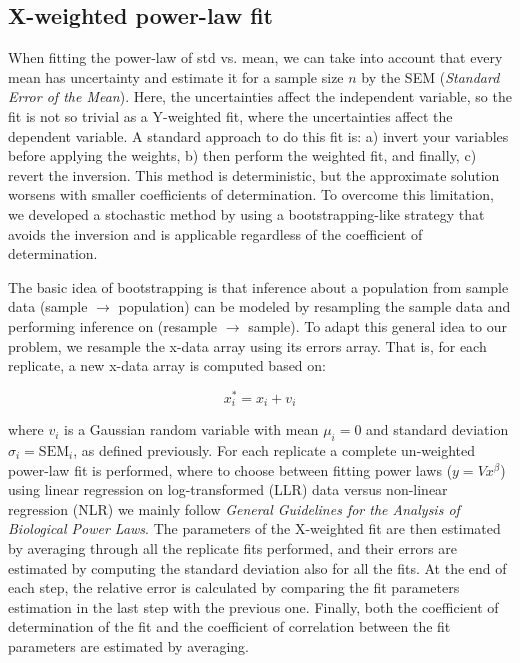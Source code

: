 \subsection*{X-weighted power-law fit}\label{sec:X-w}

When fitting the power-law of std vs. mean, we can take into account that every mean has uncertainty and estimate it for a sample size $n$ by the SEM (\emph{Standard Error of the Mean}). Here, the uncertainties affect the independent variable, so the fit is not so trivial as a Y-weighted fit, where the uncertainties affect the dependent variable. A standard approach to do this fit is: a) invert your variables before applying the weights, b) then perform the weighted fit, and finally, c) revert the inversion. This method is deterministic, but the approximate solution worsens with smaller coefficients of determination. To overcome this limitation, we developed a stochastic method by using a bootstrapping-like strategy that avoids the inversion and is applicable regardless of the coefficient of determination. 

The basic idea of bootstrapping is that inference about a population from sample data (sample $\rightarrow$ population) can be modeled by resampling the sample data and performing inference on (resample $\rightarrow$ sample)\cite{boot}. To adapt this general idea to our problem, we resample the x-data array using its errors array. That is, for each replicate, a new x-data array is computed based on:
\begin{linenomath}
$$x^*_i = x_i + v_i$$
\end{linenomath}
where $v_i$ is a Gaussian random variable with mean $\mu_i=0$ and standard deviation $\sigma_i=\mathrm{SEM}_i$, as defined previously. For each replicate a complete un-weighted power-law fit is performed, where to choose between fitting power laws ($y=Vx^\beta$) using linear regression on log-transformed (LLR) data versus non-linear regression (NLR) we mainly follow \emph{General Guidelines for the Analysis of Biological Power Laws}\cite{biopwrlaw}. The parameters of the X-weighted fit are then estimated by averaging through all the replicate fits performed, and their errors are estimated by computing the standard deviation also for all the fits. At the end of each step, the relative error is calculated by comparing the fit parameters estimation in the last step with the previous one. Finally, both the coefficient of determination of the fit and the coefficient of correlation between the fit parameters are estimated by averaging.

